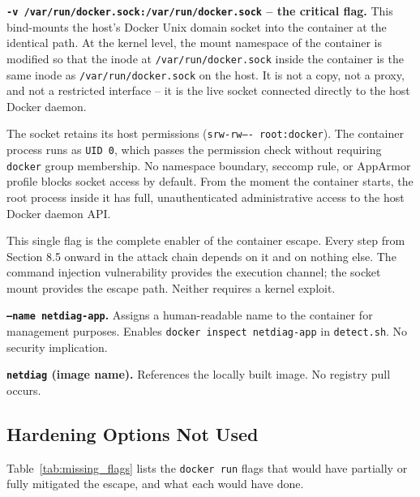 \textbf{\texttt{-v /var/run/docker.sock:/var/run/docker.sock} -- the critical flag.} This bind-mounts the host's Docker Unix domain socket into the container at the identical path. At the kernel level, the mount namespace of the container is modified so that the inode at \texttt{/var/run/docker.sock} inside the container is the same inode as \texttt{/var/run/docker.sock} on the host. It is not a copy, not a proxy, and not a restricted interface -- it is the live socket connected directly to the host Docker daemon.

The socket retains its host permissions (\texttt{srw-rw---- root:docker}). The container process runs as \texttt{UID 0}, which passes the permission check without requiring \texttt{docker} group membership. No namespace boundary, seccomp rule, or AppArmor profile blocks socket access by default. From the moment the container starts, the root process inside it has full, unauthenticated administrative access to the host Docker daemon API.

This single flag is the complete enabler of the container escape. Every step from Section 8.5 onward in the attack chain depends on it and on nothing else. The command injection vulnerability provides the execution channel; the socket mount provides the escape path. Neither requires a kernel exploit.

\textbf{\texttt{--name netdiag-app}.} Assigns a human-readable name to the container for management purposes. Enables \texttt{docker inspect netdiag-app} in \texttt{detect.sh}. No security implication.

\textbf{\texttt{netdiag} (image name).} References the locally built image. No registry pull occurs.

\subsection*{Hardening Options Not Used}

Table~\ref{tab:missing_flags} lists the \texttt{docker run} flags that would have partially or fully mitigated the escape, and what each would have done.


